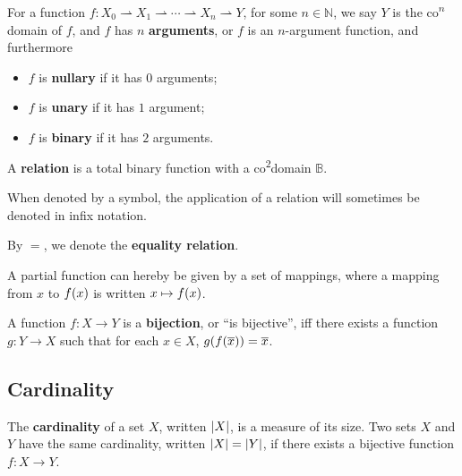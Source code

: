 \def\codomain#1{co\textsuperscript{$#1$}domain}

\begin{notation} For a function $f:X_0\rightharpoonup X_1 \rightharpoonup
\cdots \rightharpoonup X_n \rightharpoonup Y$, for some $n\in \mathbb{N}$, we
say $Y$ is the \codomain{n} of $f$, and $f$ has $n$ \textbf{arguments}, or $f$
is an $n$-argument function, and furthermore

\begin{itemize}

\item $f$ is \textbf{nullary} if it has $0$ arguments;

\item $f$ is \textbf{unary} if it has $1$ argument;

\item $f$ is \textbf{binary} if it has $2$ arguments.

\end{itemize}

\end{notation}

\begin{definition} A \textbf{relation} is a total binary function with a
\codomain{2} $\mathbb{B}$. \end{definition}

\begin{notation} When denoted by a symbol, the application of a relation will
sometimes be denoted in infix notation. \end{notation}

\begin{notation} By $=$, we denote the \textbf{equality relation}.
\end{notation}

 A partial function can hereby be given by a set of mappings,
where a mapping from $x$ to $f\mathopen{}\left({x}\right)\mathclose{}$ is written $x\mapsto f\mathopen{}\left({x}\right)\mathclose{}$.

\begin{definition} A function $f:X\rightarrow Y$ is a \textbf{bijection}, or
``is bijective'', iff there exists a function $g:Y\rightarrow X$ such that for
each $x\in X$, $g\mathopen{}\left({f\mathopen{}\left({\overline{x}}\right)\mathclose{}}\right)\mathclose{}=\overline{x}$. \end{definition}

\subsection{Cardinality}

The \textbf{cardinality} of a set $X$, written $\mathopen{}\left|{X}\right|\mathclose{}$, is a measure of its
size. Two sets $X$ and $Y$ have the same cardinality, written
$\mathopen{}\left|{X}\right|\mathclose{}=\mathopen{}\left|{Y}\right|\mathclose{}$, if there exists a bijective function $f:X\rightarrow Y$.

